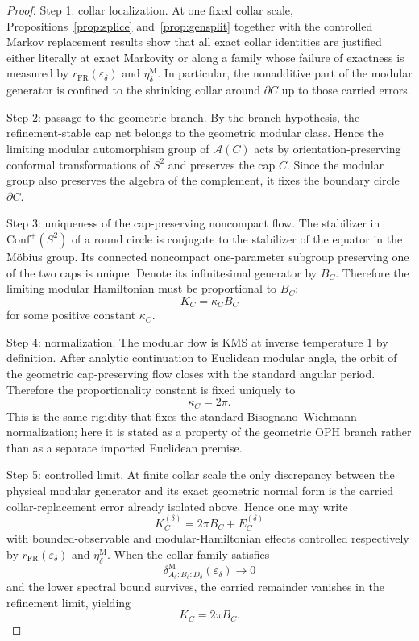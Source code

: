 \documentclass[11pt]{article}
\newcommand{\Conf}{\mathrm{Conf}}
\begin{document}
\begin{proof}
Step 1: collar localization. At one fixed collar scale, Propositions~\ref{prop:splice} and~\ref{prop:gensplit} together with the controlled Markov replacement results show that all exact collar identities are justified either literally at exact Markovity or along a family whose failure of exactness is measured by \(r_{\mathrm{FR}}(\varepsilon_\delta)\) and \(\eta_\delta^{\mathrm M}\). In particular, the nonadditive part of the modular generator is confined to the shrinking collar around \(\partial C\) up to those carried errors.

Step 2: passage to the geometric branch. By the branch hypothesis, the refinement-stable cap net belongs to the geometric modular class. Hence the limiting modular automorphism group of \(\mathcal A(C)\) acts by orientation-preserving conformal transformations of \(S^2\) and preserves the cap \(C\). Since the modular group also preserves the algebra of the complement, it fixes the boundary circle \(\partial C\).

Step 3: uniqueness of the cap-preserving noncompact flow. The stabilizer in \(\Conf^+(S^2)\) of a round circle is conjugate to the stabilizer of the equator in the M\"obius group. Its connected noncompact one-parameter subgroup preserving one of the two caps is unique. Denote its infinitesimal generator by \(B_C\). Therefore the limiting modular Hamiltonian must be proportional to \(B_C\):
\[
K_C=\kappa_C B_C
\]
for some positive constant \(\kappa_C\).

Step 4: normalization. The modular flow is KMS at inverse temperature \(1\) by definition. After analytic continuation to Euclidean modular angle, the orbit of the geometric cap-preserving flow closes with the standard angular period. Therefore the proportionality constant is fixed uniquely to
\[
\kappa_C=2\pi.
\]
This is the same rigidity that fixes the standard Bisognano--Wichmann normalization; here it is stated as a property of the geometric OPH branch rather than as a separate imported Euclidean premise.

Step 5: controlled limit. At finite collar scale the only discrepancy between the physical modular generator and its exact geometric normal form is the carried collar-replacement error already isolated above. Hence one may write
\[
K_C^{(\delta)}=2\pi B_C+E_C^{(\delta)}
\]
with bounded-observable and modular-Hamiltonian effects controlled respectively by \(r_{\mathrm{FR}}(\varepsilon_\delta)\) and \(\eta_\delta^{\mathrm M}\). When the collar family satisfies
\[
\delta^{\mathrm M}_{A_\delta:B_\delta:D_\delta}(\varepsilon_\delta)\to 0
\]
and the lower spectral bound survives, the carried remainder vanishes in the refinement limit, yielding
\[
K_C=2\pi B_C.
\]
\end{proof}
\end{document}
